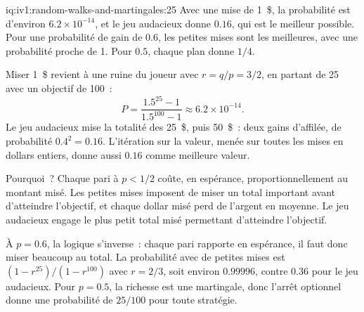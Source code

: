 \begin{solution}{iq:iv1:random-walks-and-martingales:25}
Avec une mise de 1~\$, la probabilité est d'environ $6.2 \times 10^{-14}$, et le jeu audacieux donne $0.16$, qui est le meilleur possible. Pour une probabilité de gain de $0.6$, les petites mises sont les meilleures, avec une probabilité proche de 1. Pour $0.5$, chaque plan donne $1/4$.

Miser 1~\$ revient à une ruine du joueur avec $r = q/p = 3/2$, en partant de 25 avec un objectif de 100~:
\[
P = \frac{1.5^{25} - 1}{1.5^{100} - 1} \approx 6.2 \times 10^{-14}.
\]
Le jeu audacieux mise la totalité des 25~\$, puis 50~\$~: deux gains d'affilée, de probabilité $0.4^2 = 0.16$. L'itération sur la valeur, menée sur toutes les mises en dollars entiers, donne aussi $0.16$ comme meilleure valeur.

Pourquoi~? Chaque pari à $p < 1/2$ coûte, en espérance, proportionnellement au montant misé. Les petites mises imposent de miser un total important avant d'atteindre l'objectif, et chaque dollar misé perd de l'argent en moyenne. Le jeu audacieux engage le plus petit total misé permettant d'atteindre l'objectif.

À $p = 0.6$, la logique s'inverse~: chaque pari rapporte en espérance, il faut donc miser beaucoup au total. La probabilité avec de petites mises est $(1 - r^{25})/(1 - r^{100})$ avec $r = 2/3$, soit environ $0.99996$, contre $0.36$ pour le jeu audacieux. Pour $p = 0.5$, la richesse est une martingale, donc l'arrêt optionnel donne une probabilité de $25/100$ pour toute stratégie.

\end{solution}
